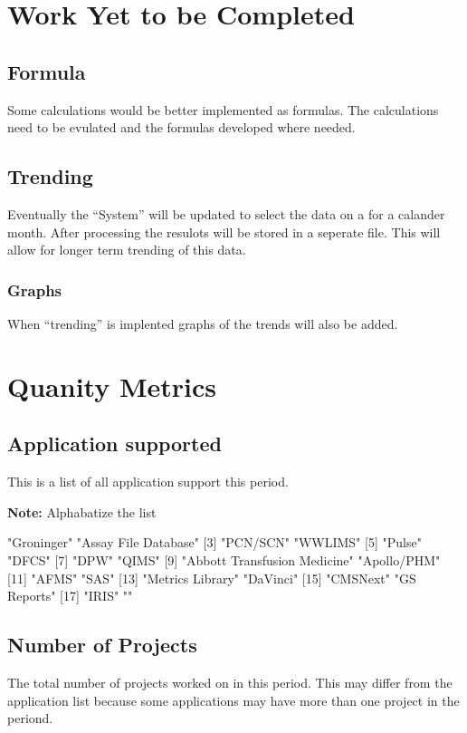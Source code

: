 \documentclass{article}
\begin{document}
\section{Work Yet to be Completed}
\subsection{Formula}
Some calculations would be better implemented as formulas. The calculations need
to be evulated and the formulas developed where needed.
\subsection{Trending}
Eventually the ``System'' will be updated to select the data on a for a calander
month. After processing the resulots will be stored in a seperate file.
This will allow for longer term trending of this data.
\subsubsection{Graphs}
When ``trending'' is implented graphs of the trends will also be added.


\section{Quanity Metrics}
\subsection{Application supported}
This is a list of all application support this period.

\textbf{Note:} Alphabatize the list

\begin{Schunk}
\begin{Soutput}
 [1] "Groninger"                   "Assay File Database"        
 [3] "PCN/SCN"                     "WWLIMS"                     
 [5] "Pulse"                       "DFCS"                       
 [7] "DPW"                         "QIMS"                       
 [9] "Abbott Transfusion Medicine" "Apollo/PHM"                 
[11] "AFMS"                        "SAS"                        
[13] "Metrics Library"             "DaVinci"                    
[15] "CMSNext"                     "GS Reports"                 
[17] "IRIS"                        ""                           
\end{Soutput}
\end{Schunk}

\subsection{Number of Projects}
The total number of  projects worked on in this period. This may differ from the
application list because some applications may have more than one project in
the periond.
\end{document}
